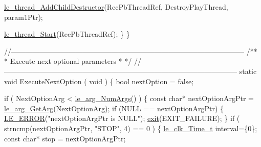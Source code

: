 \begin{DoxyCodeInclude}
{{{{{{{{{        \hyperlink{le__thread_8h_a671dbe2927a3b2a13c5150476398f34f}{le\_thread\_AddChildDestructor}(RecPbThreadRef,
                                    DestroyPlayThread,
                                    param1Ptr);

        \hyperlink{le__thread_8h_a38df3877ee5ab9fac17b2fc0be46c27e}{le\_thread\_Start}(RecPbThreadRef);
    \}
\}

\textcolor{comment}{//--------------------------------------------------------------------------------------------------}\textcolor{comment}{}
\textcolor{comment}{/**}
\textcolor{comment}{ * Execute next optional parameters}
\textcolor{comment}{ *}
\textcolor{comment}{ */}
\textcolor{comment}{//--------------------------------------------------------------------------------------------------}
\textcolor{keyword}{static} \textcolor{keywordtype}{void} ExecuteNextOption
(
    \textcolor{keywordtype}{void}
)
\{
    \textcolor{keywordtype}{bool} nextOption = \textcolor{keyword}{false};

    \textcolor{keywordflow}{if} ( NextOptionArg < \hyperlink{le__args_8h_a6fbbeb423104e6eb92fe47ef42b7310a}{le\_arg\_NumArgs}() )
    \{
        \textcolor{keyword}{const} \textcolor{keywordtype}{char}* nextOptionArgPtr = \hyperlink{le__args_8h_a5ebca8229facd069785639cb3c1e273a}{le\_arg\_GetArg}(NextOptionArg);
        \textcolor{keywordflow}{if} (NULL == nextOptionArgPtr)
        \{
            \hyperlink{le__log_8h_a353590f91b3143a7ba3a416ae5a50c3d}{LE\_ERROR}(\textcolor{stringliteral}{"nextOptionArgPtr is NULL"});
            \hyperlink{app_stop_client_8c_a310220604a584e112ba8f7aa3dfe23f1}{exit}(EXIT\_FAILURE);
        \}
        \textcolor{keywordflow}{if} ( strncmp(nextOptionArgPtr, \textcolor{stringliteral}{"STOP"}, 4) == 0 )
        \{
            \hyperlink{structle__clk___time__t}{le\_clk\_Time\_t} interval=\{0\};
            \textcolor{keyword}{const} \textcolor{keywordtype}{char}* stop = nextOptionArgPtr;

}}}}}}}}}
\end{DoxyCodeInclude}
